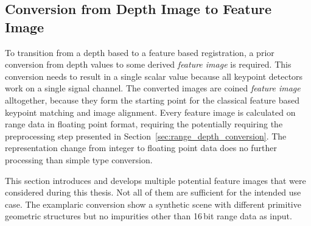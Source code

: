 \subsection{Conversion from Depth Image to Feature Image}\label{sec:feature_images}

To transition from a depth based to a feature based registration, a prior conversion from depth values to some derived \emph{feature image} is required.
This conversion needs to result in a single scalar value because all keypoint detectors work on a single signal channel.
The converted images are coined \emph{feature image} alltogether, because they form the starting point for the classical feature based keypoint matching and image alignment.
Every feature image is calculated on range data in floating point format, requiring the potentially requiring the preprocessing step presented in Section~\ref{sec:range_depth_conversion}.
The representation change from integer to floating point data does no further processing than simple type conversion.

This section introduces and develops multiple potential feature images that were considered during this thesis.
Not all of them are sufficient for the intended use case.
The examplaric conversion show a synthetic scene with different primitive geometric structures but no impurities other than 16\,bit range data as input.






